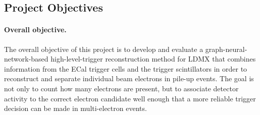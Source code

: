 \newpage

\subsection{Project Objectives}

\paragraph{Overall objective.}
The overall objective of this project is to develop and evaluate a graph-neural-network-based
high-level-trigger reconstruction method for LDMX that combines information from the
ECal trigger cells and the trigger scintillators in order to reconstruct and separate individual
beam electrons in pile-up events. The goal is not only to count how many electrons are present,
but to associate detector activity to the correct electron candidate well enough that a more
reliable trigger decision can be made in multi-electron events.

